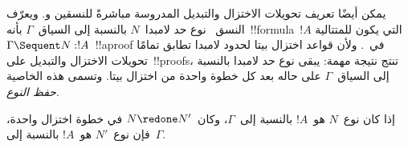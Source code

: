 \documentclass[../../../include/open-logic-section]{subfiles}
\begin{document}


يمكن أيضًا تعريف تحويلات الاختزال والتبديل المدروسة مباشرةً للنسقين
 و. ويعرّف النسق~ نوع حد لامبدا~$N$ بالنسبة
إلى السياق~$\Gamma$ بأنه~!!{formula}~$!A$ التي يكون للمتتالية
$\Gamma\Sequent N:!A$~!!a{proof} في~. ولأن قواعد اختزال بيتا
لحدود لامبدا تطابق تمامًا تحويلات الاختزال والتبديل على~!!{proof}s، تنتج
نتيجة مهمة: يبقى نوع حد لامبدا بالنسبة إلى السياق~$\Gamma$ على حاله بعد
كل خطوة واحدة من اختزال بيتا. وتسمى هذه الخاصية \emph{حفظ النوع}.

\begin{prop}
إذا كان نوع~$N$ هو~$!A$ بالنسبة إلى~$\Gamma$، وكان~$N\redone N'$ في خطوة
اختزال واحدة، فإن نوع~$N'$ هو~$!A$ بالنسبة إلى~$\Gamma$.
\end{prop}
\end{document}
